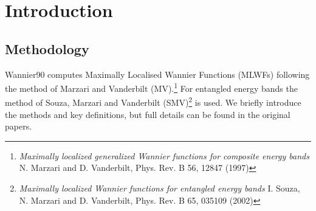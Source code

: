 \chapter{Introduction}

\section{Methodology}
Wannier90 computes Maximally Localised
Wannier Functions (MLWFs) following the method of Marzari and Vanderbilt (MV).\footnote{
{\it Maximally localized generalized Wannier functions for composite energy bands}
N. Marzari and D. Vanderbilt, Phys. Rev. B 56, 12847 (1997)}
For entangled energy bands  the method of
Souza, Marzari and Vanderbilt (SMV)\footnote{{\it Maximally localized
    Wannier functions for entangled energy bands} 
I. Souza, N. Marzari and D. Vanderbilt, Phys. Rev. B 65, 035109 (2002)}
is used.
We briefly introduce the methods and key definitions, but full details
can be found in the original papers. 

